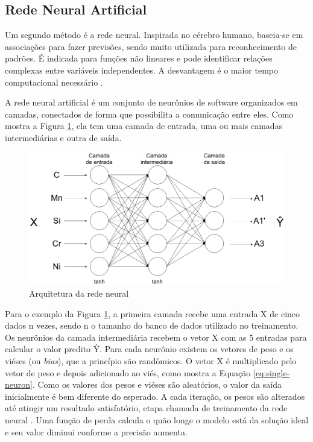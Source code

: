 \documentclass[brazil,tf,epusp]{usp}  %
\begin{document}
\subsection{Rede Neural Artificial}
Um segundo método é a rede neural. Inspirada no cérebro humano, baseia-se em associações para fazer previsões, sendo muito utilizada para reconhecimento de padrões. É indicada para funções não lineares e pode identificar relações complexas entre variáveis independentes. A desvantagem é o maior tempo computacional necessário \cite{Belisle2015}.

A rede neural artificial é um conjunto de neurônios de software organizados em camadas, conectados de forma que possibilita a comunicação entre eles. Como mostra a Figura \ref{fig:rede-neural-arquitetura}, ela tem uma camada de entrada, uma ou mais camadas intermediárias e outra de saída.

\begin{figure}[ht!]
  \includegraphics[width=.9\textwidth]{img/neural-network.png}
  \caption{Arquitetura da rede neural}
  \label{fig:rede-neural-arquitetura}
\end{figure}

Para o exemplo da Figura \ref{fig:rede-neural-arquitetura}, a primeira camada recebe uma entrada X de cinco dados n vezes, sendo n o tamanho do banco de dados utilizado no treinamento. Os neurônios da camada intermediária recebem o vetor X com as 5 entradas para calcular o valor predito Ŷ. Para cada neurônio existem os vetores de peso e os viéses (ou \textit{bias}), que a princípio são randômicos. O vetor X é multiplicado pelo vetor de peso e depois adicionado ao viés, como mostra a Equação \ref{eq:single-neuron}. Como os valores dos pesos e viéses são aleatórios, o valor da saída inicialmente é bem diferente do esperado. A cada iteração, os pesos são alterados até atingir um resultado satisfatório, etapa chamada de treinamento da rede neural \cite{Bhadeshia1999}. Uma função de perda calcula o quão longe o modelo está da solução ideal e seu valor diminui conforme a precisão aumenta.
\end{document}
